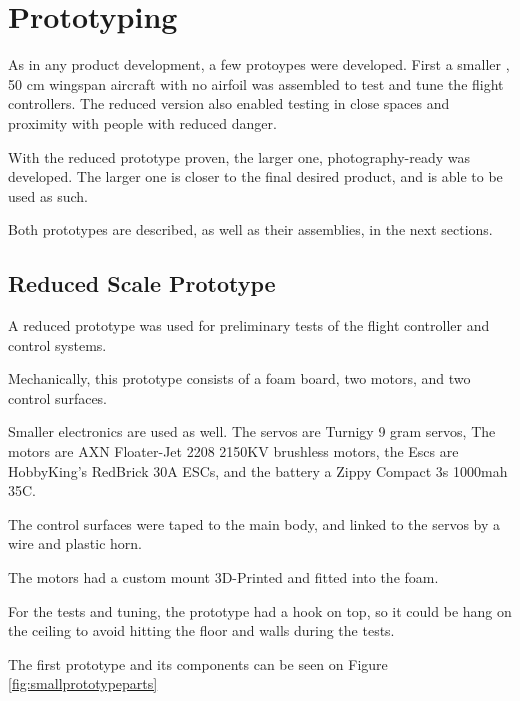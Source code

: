 \chapter{Prototyping} \label{chap:prototyping}

As in any product development, a few protoypes were developed.
First a smaller , 50 cm wingspan aircraft with no airfoil was assembled to test and tune the flight controllers. The reduced version also enabled testing in close spaces and proximity with people with reduced danger.

With the reduced prototype proven, the larger one, photography-ready was developed. The larger one is closer to the final desired product, and is able to be used as such.

Both prototypes are described, as well as their assemblies, in the next sections.
 


\section{Reduced Scale Prototype}

A reduced prototype was used for preliminary tests of the flight controller and control systems.

Mechanically, this prototype consists of a foam board, two motors, and two control surfaces.

Smaller electronics are used as well. The servos are Turnigy 9 gram servos, The motors are AXN Floater-Jet 2208 2150KV brushless motors, the Escs are HobbyKing's RedBrick 30A ESCs, and the battery a Zippy Compact 3s 1000mah 35C.

The control surfaces were taped to the main body, and linked to the servos by a wire and plastic horn.

The motors had a custom mount 3D-Printed and fitted into the foam.

For the tests and tuning, the prototype had a hook on top, so it could be hang on the ceiling to avoid hitting the floor and walls during the tests.

The first prototype and its components can be seen on Figure \ref{fig:smallprototypeparts}

